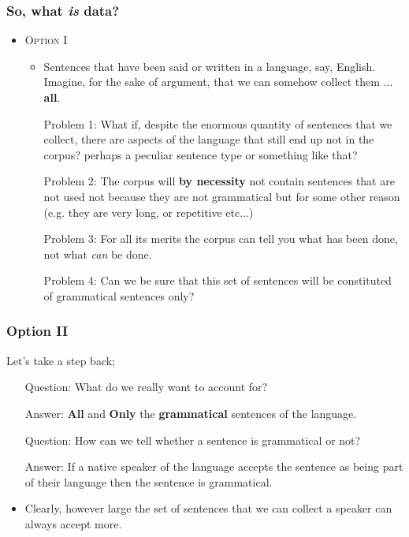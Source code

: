 \begin{frame}
  \frametitle{So, what \textit{is} data?}
  \begin{itemize}
  \item \textsc{Option I}
    \begin{itemize}
    \item Sentences that have been said or written in a language, say, English. \pause Imagine, for the sake of argument, that we can somehow collect them ... \textbf{all}. \pause
    \item[Problem 1:]  What if, despite the enormous quantity of sentences that we collect, there are aspects of the language that still end up not in the corpus?  perhaps a peculiar sentence type or something like that? \pause
    \item[Problem 2:]  The corpus will \textbf{by necessity} not contain sentences that are not used not because they are not grammatical but for some other reason (e.g. they are very long, or repetitive etc...) \pause
   \item[Problem 3:] For all its merits the corpus can tell you what has been done, not what \textit{can} be done.
   \item [Problem 4:] Can we be sure that this set of sentences will be constituted of grammatical sentences only?
     \end{itemize}
 \end{itemize}
\end{frame}


\begin{frame}
\frametitle{Option II}  

Let's take a step back; 
\begin{itemize}
\item[Question:] What do we really want to account for? \pause
\item[Answer:] \textbf{All} and \textbf{Only} the \textbf{grammatical} sentences of the language. \pause
\item[Question:] How can we tell whether a sentence is grammatical or not? \pause
\item[Answer:]If a native speaker of the language accepts the sentence as being part of their language then the sentence is grammatical. \pause
\item Clearly, however large the set of sentences that we can collect a speaker can always accept more.

\end{itemize}
\end{frame}

